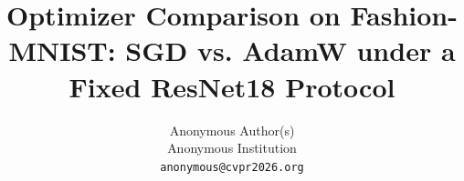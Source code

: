\documentclass[10pt,twocolumn,letterpaper]{article}
\title{Optimizer Comparison on Fashion-MNIST: SGD vs. AdamW under a Fixed ResNet18 Protocol}
\author{Anonymous Author(s)\\
Anonymous Institution\\
{\tt\small anonymous@cvpr2026.org}}
\begin{document}
\maketitle




{
    \small
    
    
}

% 
\end{document}
